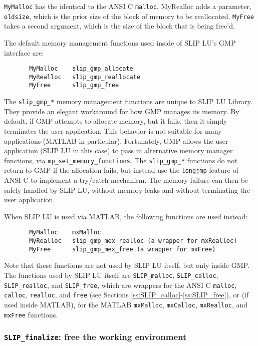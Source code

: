 \documentclass[11pt]{article}
\theoremstyle{definition}
\begin{document}
  \verb|MyMalloc| has the identical to the ANSI C \verb|malloc|.  MyRealloc adds a parameter,
  \verb|oldsize|, which is the prior size of the block of memory to be reallocated.
  \verb|MyFree| takes a second argument, which is the size of the block that is being free'd.

  The default memory management functions used inside of SLIP LU's GMP interface are:

\begin{verbatim}
       MyMalloc    slip_gmp_allocate
       MyRealloc   slip_gmp_reallocate
       MyFree      slip_gmp_free
\end{verbatim}

  The \verb|slip_gmp_*| memory management functions are unique to SLIP LU Library.  They
  provide an elegant workaround for how GMP manages its memory.  By default,
  if GMP attempts to allocate memory, but it fails, then it simply terminates
  the user application.  This behavior is not suitable for many applications
  (MATLAB in particular).  Fortunately, GMP allows the user application
  (SLIP LU in this case) to pass in alternative memory manager functions, via
  \verb|mp_set_memory_functions|.  The \verb|slip_gmp_*| functions do not return to GMP if
  the allocation fails, but instead use the \verb|longjmp| feature of ANSI C to
  implement a try/catch mechanism.  The memory failure can then be safely
  handled by SLIP LU, without memory leaks and without terminating the user
  application.

  When SLIP LU is used via MATLAB, the following functions are used instead:

\begin{verbatim}
       MyMalloc    mxMalloc
       MyRealloc   slip_gmp_mex_realloc (a wrapper for mxRealloc)
       MyFree      slip_gmp_mex_free (a wrapper for mxFree)
\end{verbatim}

  Note that these functions are not used by SLIP LU itself, but only inside
  GMP.  The functions used by SLIP LU itself are \verb|SLIP_malloc|, \verb|SLIP_calloc|,
  \verb|SLIP_realloc|, and \verb|SLIP_free|, which are wrappers for the ANSI C \verb|malloc|,
  \verb|calloc|, \verb|realloc|, and \verb|free| (see Sections \ref{ss:SLIP_calloc}-\ref{ss:SLIP_free}), or (if used inside MATLAB), for the MATLAB
  \verb|mxMalloc|, \verb|mxCalloc|, \verb|mxRealloc|, and \verb|mxFree| functions.

\cprotect\subsubsection{\verb|SLIP_finalize|: free the working environment}\label{ss:SLIP_finalize}
\end{document}
